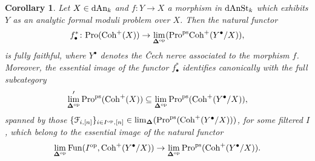 \documentclass[10pt,a4paper,reqno]{amsart} %
\theoremstyle{plain}
\newtheorem{cor}[thm]{Corollary}
\theoremstyle{definition}
\theoremstyle{remark}
\numberwithin{equation}{section}
\begin{document}
\begin{cor} \label{cor:pseudo_nil-descent_for_pro_Coh^+}
    Let $X \in \mathrm{dAn}_k$ and $f \colon Y \to X$ a morphism in $\mathrm{dAnSt}_k$ which exhibits $Y$ as an analytic formal moduli problem over $X$.
    Then the natural functor 
        \[
            f_\bullet^* \colon \mathrm{Pro}(\mathrm{Coh}^+ (X)) \to \lim_{\bm{\Delta} ^\mathrm{op}}(\mathrm{Pro}^\mathrm{ps}\mathrm{Coh}^+(Y^\bullet/X)),
        \]
    is fully faithful, where $Y^\bullet$ denotes the \v{C}ech nerve associated to the morphism $f$. Moreover, the essential image of the functor $f_\bullet^*$ identifies canonically with the full subcategory
        \[
            \lim_{\bm{\Delta} ^\mathrm{op}}'\mathrm{Pro}^\mathrm{ps}(\mathrm{Coh}^+(X)) \subseteq \lim_{\bm{\Delta} ^\mathrm{op}} \mathrm{Pro}^\mathrm{ps}(\mathrm{Coh}^+(Y^\bullet/ X)),
        \]
    spanned by those $\{\mathcal F_{i, [n]} \}_{i \in I^\mathrm{op}, [n]} \in \lim_{\bm{\Delta}}(\mathrm{Pro}^\mathrm{ps}(\mathrm{Coh}^+(Y^\bullet/X)))$, for some filtered \infcat $I$, which belong to the essential image of the natural
    functor
        \[
            \lim_{\bm{\Delta} ^\mathrm{op}} \operatorname{Fun}(I^\mathrm{op}, \mathrm{Coh}^+(Y^\bullet/X)) \to \lim_{\bm{\Delta} ^\mathrm{op}} \mathrm{Pro}^\mathrm{ps}(\mathrm{Coh}^+(Y^\bullet/X)) . 
        \]
\end{cor}
\end{document}
